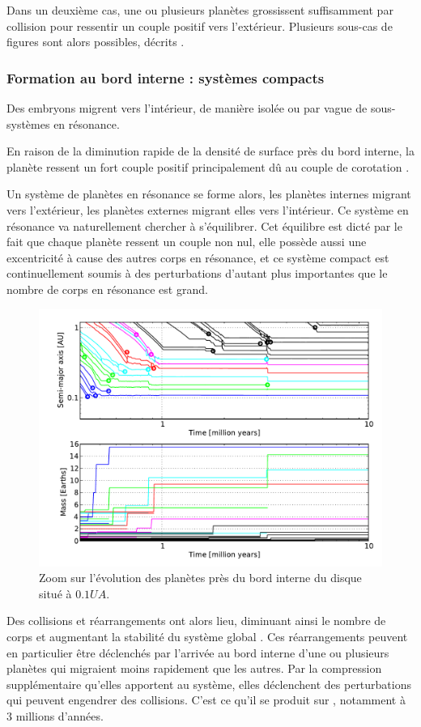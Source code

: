 Dans un deuxième cas, une ou plusieurs planètes grossissent suffisamment par collision pour ressentir un couple positif vers l'extérieur. Plusieurs sous-cas de figures sont alors possibles, décrits .

\subsubsection{Formation au bord interne : systèmes compacts}\label{sec:inner_edge_formation}
Des embryons migrent vers l'intérieur, de manière isolée ou par vague de sous-systèmes en résonance.

En raison de la diminution rapide de la densité de surface près du bord interne, la planète ressent un fort couple positif principalement dû au couple de corotation . 

Un système de planètes en résonance se forme alors, les planètes internes migrant vers l'extérieur, les planètes externes migrant elles vers l'intérieur. Ce système en résonance va naturellement chercher à s'équilibrer. Cet équilibre est dicté par le fait que chaque planète ressent un couple non nul, elle possède aussi une excentricité à cause des autres corps en résonance, et ce système compact est continuellement soumis à des perturbations d'autant plus importantes que le nombre de corps en résonance est grand. 

\begin{figure}[htb]
\centering
\includegraphics[width=0.45\linewidth]{figure/HSE/inner_system.pdf}
\caption{Zoom sur l'évolution des planètes près du bord interne du disque situé à $0.1\unit{UA}$. }\label{fig:HSE_inner_system}
\end{figure}

Des collisions et réarrangements ont alors lieu, diminuant ainsi le nombre de corps et augmentant la stabilité du système global . Ces réarrangements peuvent en particulier être déclenchés par l'arrivée au bord interne d'une ou plusieurs planètes qui migraient moins rapidement que les autres. Par la compression supplémentaire qu'elles apportent au système, elles déclenchent des perturbations qui peuvent engendrer des collisions. C'est ce qu'il se produit sur  , notamment à 3 millions d'années. 

